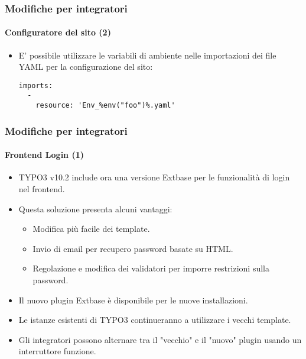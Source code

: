 \begin{frame}[fragile]
	\frametitle{Modifiche per integratori}
	\framesubtitle{Configuratore del sito (2)}

	\lstset{basicstyle=\tiny\ttfamily}

	\begin{itemize}

		\item E' possibile utilizzare le variabili di ambiente nelle importazioni dei file YAML per la configurazione del sito:
\begin{lstlisting}
imports:
  -
    resource: 'Env_%env("foo")%.yaml'
\end{lstlisting}

	\end{itemize}

\end{frame}


\begin{frame}[fragile]
	\frametitle{Modifiche per integratori}
	\framesubtitle{Frontend Login (1)}

	\begin{itemize}

		\item TYPO3 v10.2 include ora una versione Extbase per le funzionalità di login nel frontend.
		\item Questa soluzione presenta alcuni vantaggi:

			\begin{itemize}
				\item Modifica più facile dei template.
				\item Invio di email per recupero password basate su HTML.
				\item Regolazione e modifica dei validatori per imporre restrizioni sulla password.
			\end{itemize}

		\item Il nuovo plugin Extbase è disponibile per le nuove installazioni.
		\item Le istanze esistenti di TYPO3 continueranno a utilizzare i vecchi template.
		\item Gli integratori possono alternare tra il "vecchio" e il "nuovo" plugin usando un interruttore funzione.

	\end{itemize}

\end{frame}

